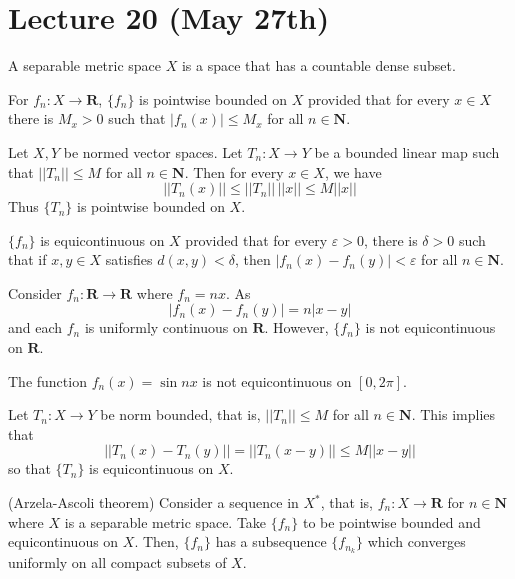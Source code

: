 \section{Lecture 20 (May 27th)}
\begin{defi}
A separable metric space $X$ is a space that has a countable dense subset.
\end{defi}
\vspace{2ex}
\begin{defi}
For $f_{n}:X\rightarrow {\bm R}$, $\{f_{n}\}$ is pointwise bounded on $X$ provided that for every $x\in X$ there is $M_{x}>0$ such that $|f_{n}(x)|\leq M_{x}$ for all $n\in {\bm N}$.
\end{defi}
\vspace{2ex}
\begin{ex}
Let $X,Y$ be normed vector spaces. Let $T_{n}:X\rightarrow Y$ be a bounded linear map such that $||T_{n}||\leq M$ for all $n\in {\bm N}$. Then for every $x\in X$, we have
\[||T_{n}(x)||\leq ||T_{n}||\,||x||\leq M||x||\]
Thus $\{T_{n}\}$ is pointwise bounded on $X$.
\end{ex}
\vspace{2ex}
\begin{defi}
$\{f_{n}\}$ is equicontinuous on $X$ provided that for every $\varepsilon >0$, there is $\delta >0$ such that if $x,y\in X$ satisfies $d(x,y)<\delta $, then $|f_{n}(x)-f_{n}(y)|<\varepsilon $ for all $n\in {\bm N}$.
\end{defi}
\vspace{2ex}
\begin{ex}
Consider $f_{n}:{\bm R}\rightarrow {\bm R}$ where $f_{n}=nx$. As
\[|f_{n}(x)-f_{n}(y)|=n|x-y|\]
and each $f_{n}$ is uniformly continuous on ${\bm R}$. However, $\{f_{n}\}$ is not equicontinuous on ${\bm R}$.
\end{ex}
\vspace{2ex}
\begin{ex}
The function $f_{n}(x)=\sin nx$ is not equicontinuous on $[0,2\pi ]$.
\end{ex}
\vspace{2ex}
\begin{ex}
Let $T_{n}:X\rightarrow Y$ be norm bounded, that is, $||T_{n}||\leq M$ for all $n\in {\bm N}$. This implies that 
\[||T_{n}(x)-T_{n}(y)||=||T_{n}(x-y)||\leq M||x-y||\]
so that $\{T_{n}\}$ is equicontinuous on $X$. 
\end{ex}
\vspace{2ex}
\begin{thm}
(Arzela-Ascoli theorem) Consider a sequence in $X^{*}$, that is, $f_{n}:X\rightarrow {\bm R}$ for $n\in {\bm N}$ where $X$ is a separable metric space. Take $\{f_{n}\}$ to be pointwise bounded and equicontinuous on $X$. Then, $\{f_{n}\}$ has a subsequence $\{f_{n_{k}}\}$ which converges uniformly on all compact subsets of $X$. 
\end{thm}
